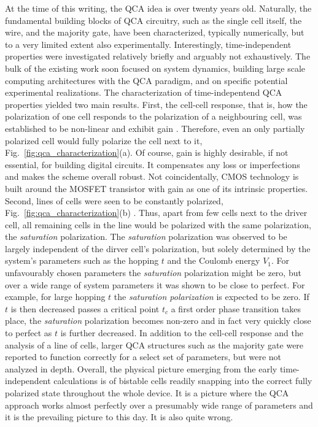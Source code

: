 At the time of this writing, the QCA idea is over twenty years old. Naturally,
the fundamental building blocks of QCA circuitry, such as the single cell
itself, the wire, and the majority gate, have been characterized, typically
numerically, but to a very limited extent also experimentally. Interestingly,
time-independent properties were investigated relatively briefly and arguably
not exhaustively. The bulk of the existing work soon focused on system dynamics,
building large scale computing architectures with the QCA paradigm, and on
specific potential experimental realizations. The characterization of
time-indepentend QCA properties yielded two main results. First, the cell-cell
response, that is, how the polarization of one cell responds to the polarization
of a neighbouring cell, was established to be non-linear and exhibit gain
\cite{lent1993quantum}. Therefore, even an only partially polarized cell would
fully polarize the cell next to it, Fig.~\ref{fig:qca_characterization}(a). Of
course, gain is highly desirable, if not essential, for building digital
circuits. It compensates any loss or imperfections and makes the scheme overall
robust. Not coincidentally, CMOS technology is built around the MOSFET
transistor with gain as one of its intrinsic properties. Second, lines of cells
were seen to be constantly polarized, Fig.~\ref{fig:qca_characterization}(b)
\cite{lent1993lines}. Thus, apart from few cells next to the driver cell, all
remaining cells in the line would be polarized with the same polarization, the
\emph{saturation} polarization. The \emph{saturation} polarization was observed
to be largely independent of the dirver cell's polarization, but solely
determined by the system's parameters such as the hopping $t$ and the Coulomb
energy $V_1$. For unfavourably chosen parameters the \emph{saturation}
polarization might be zero, but over a wide range of system parameters it was
shown to be close to perfect. For example, for large hopping $t$ the
\emph{saturation polarization} is expected to be zero. If $t$ is then decreased
passes a critical point $t_c$ a first order phase transition takes place, the
\emph{saturation} polarization becomes non-zero and in fact very quickly close
to perfect as $t$ is further decreased. In addition to the cell-cell response
and the analysis of a line of cells, larger QCA structures such as the majority
gate were reported to function correctly for a select set of parameters, but
were not analyzed in depth. Overall, the physical picture emerging from the
early time-independent calculations is of bistable cells readily snapping into
the correct fully polarized state throughout the whole device. It is a picture
where the QCA approach works almost perfectly over a presumably wide range of
parameters and it is the prevailing picture to this day. It is also quite wrong.

